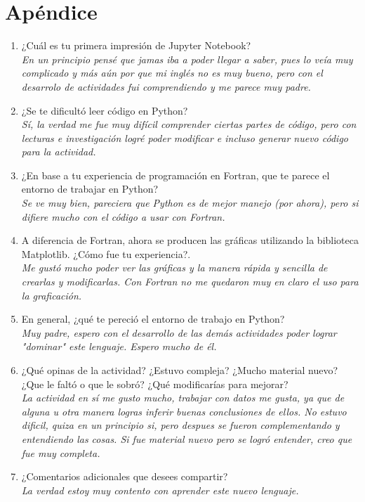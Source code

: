 \documentclass[12pt]{article}
\begin{document}
\section{Apéndice}
\begin{enumerate}
\item ¿Cuál es tu primera impresión de Jupyter Notebook?\\

\textit{En un principio pensé que jamas iba a poder llegar a saber, pues lo veía muy complicado y más aún por que mi inglés no es muy bueno, pero con el desarrolo de actividades fui comprendiendo y me parece muy padre.}

\item  ¿Se te dificultó leer código en Python?\\

\textit{Sí, la verdad me fue muy difícil comprender ciertas partes de código, pero con lecturas e investigación logré poder modificar e incluso generar nuevo código para la actividad.}

\item  ¿En base a tu experiencia de programación en Fortran, que te parece el entorno de trabajar en Python?\\

\textit{Se ve muy bien, pareciera que Python es de mejor manejo (por ahora), pero si difiere mucho con el código a usar con Fortran.}

\item  A diferencia de Fortran, ahora se producen las gráficas utilizando la biblioteca Matplotlib. ¿Cómo fue tu experiencia?. \\

\textit{Me gustó mucho poder ver las gráficas y la manera rápida y sencilla de crearlas y modificarlas. Con Fortran no me quedaron muy en claro el uso para la graficación.}

\item En general, ¿qué te pereció el entorno de trabajo en Python? \\

\textit{Muy padre, espero con el desarrollo de las demás actividades poder lograr "dominar" este lenguaje. Espero mucho de él.}

\item  ¿Qué opinas de la actividad? ¿Estuvo compleja? ¿Mucho material nuevo? ¿Que le faltó o que le sobró? ¿Qué modificarías para mejorar? \\

\textit{La actividad en sí me gusto mucho, trabajar con datos me gusta, ya que de alguna u otra manera logras inferir buenas conclusiones de ellos. No estuvo dificil, quiza en un principio si, pero despues se fueron complementando y entendiendo las cosas. Si fue material nuevo pero se logró entender, creo que fue muy completa.}

\item ¿Comentarios adicionales que desees compartir? \\

\textit{La verdad estoy muy contento con aprender este nuevo lenguaje.}
\end{enumerate}
\end{document}

